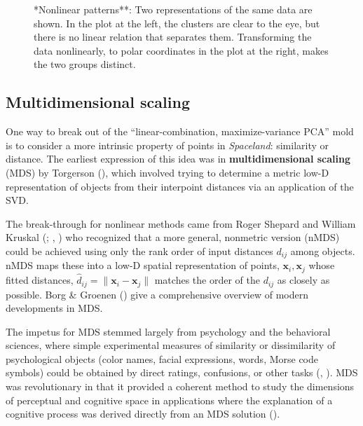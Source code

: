 \documentclass[
  letterpaper,
  10pt,
  krantz2]{krantz}
\begin{document}
{\begin{figure}
{}

\caption{\label{fig-nonlin-demo}*Nonlinear patterns**: Two
representations of the same data are shown. In the plot at the left, the
clusters are clear to the eye, but there is no linear relation that
separates them. Transforming the data nonlinearly, to polar coordinates
in the plot at the right, makes the two groups distinct.}

\end{figure}%

\subsection{Multidimensional scaling}\label{multidimensional-scaling}

One way to break out of the ``linear-combination, maximize-variance
PCA'' mold is to consider a more intrinsic property of points in
\emph{Spaceland}: similarity or distance. The earliest expression of
this idea was in \textbf{multidimensional scaling} (MDS) by Torgerson
(), which involved trying to determine
a metric low-D representation of objects from their interpoint distances
via an application of the SVD.

The break-through for nonlinear methods came from Roger Shepard and
William Kruskal (;
,
) who recognized that a more general,
nonmetric version (nMDS) could be achieved using only the rank order of
input distances \(d_{ij}\) among objects. nMDS maps these into a low-D
spatial representation of points, \(\mathbf{x}_i, \mathbf{x}_j\) whose
fitted distances,
\(\hat{d}_{ij} = \lVert\mathbf{x}_i - \mathbf{x}_j\rVert\) matches the
order of the \(d_{ij}\) as closely as possible. Borg \& Groenen
() give a comprehensive overview of
modern developments in MDS.

The impetus for MDS stemmed largely from psychology and the behavioral
sciences, where simple experimental measures of similarity or
dissimilarity of psychological objects (color names, facial expressions,
words, Morse code symbols) could be obtained by direct ratings,
confusions, or other tasks (, ). MDS was
revolutionary in that it provided a coherent method to study the
dimensions of perceptual and cognitive space in applications where the
explanation of a cognitive process was derived directly from an MDS
solution ().

}
\end{document}
